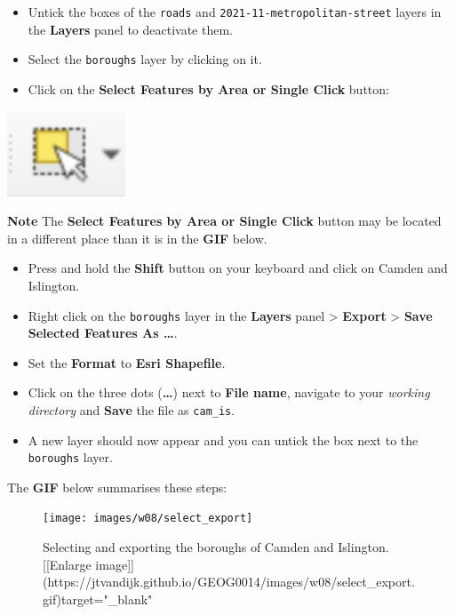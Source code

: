 \documentclass[
]{book}
\providecommand{\tightlist}{%
  \setlength{\itemsep}{0pt}\setlength{\parskip}{0pt}}
\begin{document}
\begin{itemize}
\tightlist
\item
  Untick the boxes of the \texttt{roads} and \texttt{2021-11-metropolitan-street} layers in the \textbf{Layers} panel to deactivate them.
\item
  Select the \texttt{boroughs} layer by clicking on it.
\item
  Click on the \textbf{Select Features by Area or Single Click} button:
\end{itemize}

\begin{center}\includegraphics[width=1.39in]{images/w08/select} \end{center}

\textbf{Note}
The \textbf{Select Features by Area or Single Click} button may be located in a different place than it is in the \textbf{GIF} below.

\begin{itemize}
\tightlist
\item
  Press and hold the \textbf{Shift} button on your keyboard and click on Camden and Islington.
\item
  Right click on the \texttt{boroughs} layer in the \textbf{Layers} panel \textgreater{} \textbf{Export} \textgreater{} \textbf{Save Selected Features As \ldots{}}.
\item
  Set the \textbf{Format} to \textbf{Esri Shapefile}.
\item
  Click on the three dots (\textbf{\ldots{}}) next to \textbf{File name}, navigate to your \emph{working directory} and \textbf{Save} the file as \texttt{cam\_is}.
\item
  A new layer should now appear and you can untick the box next to the \texttt{boroughs} layer.
\end{itemize}

The \textbf{GIF} below summarises these steps:

\begin{figure}

{\centering \texttt{[image: images/w08/select\_export]} 

}

\caption{Selecting and exporting the boroughs of Camden and Islington. [[Enlarge image]](https://jtvandijk.github.io/GEOG0014/images/w08/select_export.gif){target="_blank"}}\label{fig:select-boroughs}
\end{figure}
\end{document}
